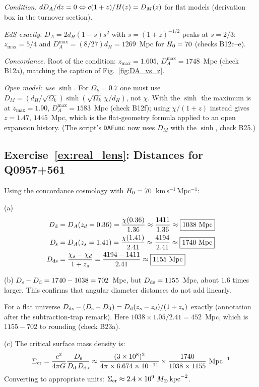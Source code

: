 \begin{derivation}
\textit{Condition.}  $dD_A/dz = 0 \Leftrightarrow c(1+z)/H(z) = D_M(z)$
for flat models (derivation box in the turnover section).

\textit{EdS exactly.}  $D_A = 2d_H(1-s)s^2$ with $s = (1+z)^{-1/2}$ peaks at
$s = 2/3$: $z_{\max} = 5/4$ and $D_A^{\max} = (8/27)d_H = 1269$~Mpc for
$H_0 = 70$ (checks B12c--e).

\textit{Concordance.}  Root of the condition: $z_{\max} = 1.605$,
$D_A^{\max} = 1748$~Mpc (check B12a), matching the caption of
Fig.~\ref{fig:DA_vs_z}.

\textit{Open model: use $\sinh$.}  For $\Omega_k = 0.7$ one must use
$D_M = (d_H/\sqrt{\Omega_k})\sinh(\sqrt{\Omega_k}\,\chi/d_H)$, not $\chi$.  With the
$\sinh$ the maximum is at $z_{\max} = 1.90$, $D_A^{\max} = 1583$~Mpc
(check B12f); using $\chi/(1+z)$ instead gives $z = 1.47$, $1445$~Mpc, which is
the flat-geometry formula applied to an open expansion history.  (The script's
\texttt{DAFunc} now uses $D_M$ with the $\sinh$, check B25.)
\end{derivation}
\subsection*{Exercise~\ref{ex:real_lens}: Distances for Q0957+561}

Using the concordance cosmology with $H_0 = 70$~km\,s$^{-1}$\,Mpc$^{-1}$:

(a)
\begin{align*}
    D_{\mathrm{d}} &= D_A(z_d = 0.36) = \frac{\chi(0.36)}{1.36}
    \approx \frac{1411}{1.36} \approx \boxed{1038~\text{Mpc}} \\
    D_{\mathrm{s}} &= D_A(z_s = 1.41) = \frac{\chi(1.41)}{2.41}
    \approx \frac{4194}{2.41} \approx \boxed{1740~\text{Mpc}} \\
    D_{\mathrm{ds}} &= \frac{\chi_s - \chi_d}{1 + z_s}
    = \frac{4194 - 1411}{2.41} \approx \boxed{1155~\text{Mpc}}
\end{align*}

(b) $D_{\mathrm{s}} - D_{\mathrm{d}} = 1740 - 1038 = 702$~Mpc, but
$D_{\mathrm{ds}} = 1155$~Mpc, about $1.6$ times larger.  This
confirms that angular diameter distances do not add linearly.


\begin{annotation}
For a flat universe $D_{\mathrm{ds}} - (D_{\mathrm{s}} - D_{\mathrm{d}}) = D_{\mathrm{d}}(z_s - z_d)/(1+z_s)$ exactly
(annotation after the subtraction-trap remark).  Here
$1038 \times 1.05/2.41 = 452$~Mpc, which is $1155 - 702$ to rounding
(check B23a).
\end{annotation}
(c) The critical surface mass density is:
\[
    \Sigma_{\mathrm{cr}} = \frac{c^2}{4\pi G}
    \frac{D_{\mathrm{s}}}{D_{\mathrm{d}}\,D_{\mathrm{ds}}}
    \approx \frac{(3 \times 10^8)^2}{4\pi \times 6.674 \times 10^{-11}}
    \times \frac{1740}{1038 \times 1155}~\text{Mpc}^{-1}
\]
Converting to appropriate units:
$\Sigma_{\mathrm{cr}} \approx 2.4 \times 10^9~M_{\odot}\,\text{kpc}^{-2}$.


